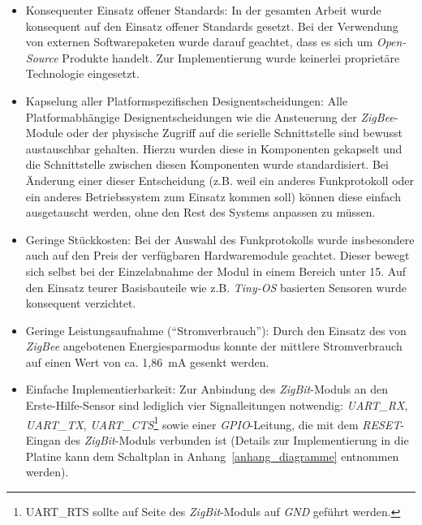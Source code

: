 \begin{itemize}
    \item{Konsequenter Einsatz offener Standards:} In der gesamten Arbeit wurde konsequent auf den
          Einsatz offener Standards gesetzt. Bei der Verwendung von externen Softwarepaketen wurde
          darauf geachtet, dass es sich um \emph{Open-Source} Produkte handelt. Zur Implementierung
          wurde keinerlei proprietäre Technologie eingesetzt.

    \item{Kapselung aller Platformspezifischen Designentscheidungen:} Alle Platformabhängige
          Designentscheidungen wie die Ansteuerung der \emph{ZigBee}-Module oder der
          physische Zugriff auf die serielle Schnittstelle sind bewusst austauschbar gehalten.
          Hierzu wurden diese in Komponenten gekapselt und die Schnittstelle zwischen diesen
          Komponenten wurde standardisiert. Bei Änderung einer dieser Entscheidung (z.B.
          weil ein anderes Funkprotokoll oder ein anderes Betriebssystem zum Einsatz kommen soll)
          können diese einfach ausgetauscht werden, ohne den Rest des Systems anpassen zu 
          müssen.

    \item{Geringe Stückkosten:} Bei der Auswahl des Funkprotokolls wurde insbesondere auch auf den
          Preis der verfügbaren Hardwaremodule geachtet. Dieser bewegt sich selbst bei der
          Einzelabnahme der Modul in einem Bereich unter 15\EUR{}. Auf den Einsatz teurer
          Basisbauteile wie z.B. \emph{Tiny-OS} basierten Sensoren wurde konsequent verzichtet.

    \item{Geringe Leistungsaufnahme ("`Stromverbrauch"'):} Durch den Einsatz des von \emph{ZigBee}
          angebotenen Energiesparmodus konnte der mittlere Stromverbrauch auf einen Wert von ca. 
          1,86~mA gesenkt werden.

    \item{Einfache Implementierbarkeit:} Zur Anbindung des \emph{ZigBit}-Moduls an den Erste-Hilfe-Sensor
          sind lediglich vier Signalleitungen notwendig: \emph{UART\_RX}, \emph{UART\_TX}, 
          \emph{UART\_CTS}\footnote{UART\_RTS sollte auf Seite des \emph{ZigBit}-Moduls auf \emph{GND}
              geführt werden.} sowie einer \emph{GPIO}-Leitung, die mit dem \emph{RESET}-Eingan des
          \emph{ZigBit}-Moduls verbunden ist (Details zur Implementierung in die Platine kann dem
          Schaltplan in Anhang~\ref{anhang_diagramme} entnommen werden). 


\end{itemize}
